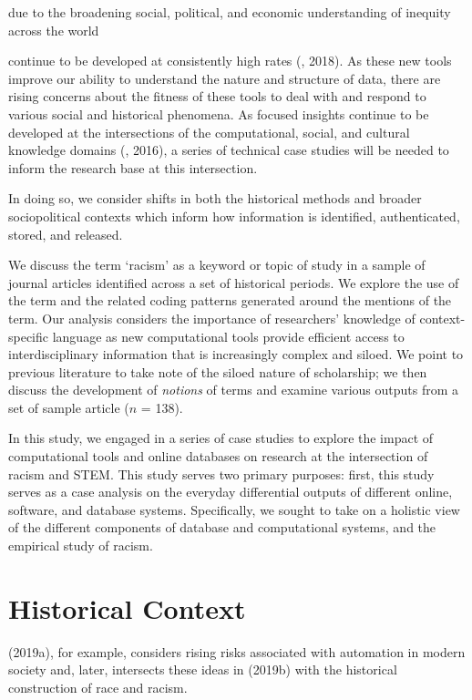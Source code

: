 due to the broadening social, political, and economic understanding of inequity across the world 

 continue to be developed at consistently high rates (\citeauthor{walker2018}, 2018). As these new tools improve our ability to understand the nature and structure of data, there are rising concerns about the fitness of these tools to deal with and respond to various social and historical phenomena. As focused insights continue to be developed at the intersections of the computational, social, and cultural knowledge domains (\cite{dixon2016algo}, 2016), a series of technical case studies will be needed to inform the research base at this intersection.

 In doing so, we consider shifts in both the historical methods and broader sociopolitical contexts which inform how information is identified, authenticated, stored, and released. 

We discuss the term `racism' as a keyword or topic of study in a sample of journal articles identified across a set of historical periods. We explore the use of the term and the related coding patterns generated around the mentions of the term. Our analysis considers the importance of researchers' knowledge of context-specific language as new computational tools provide efficient access to interdisciplinary information that is increasingly complex and siloed. We point to previous literature to take note of the siloed nature of scholarship; we then discuss the development of \textit{notions} of terms and examine various outputs from a set of sample article ($n$ = 138).

 

In this study, we engaged in a series of case studies to explore the impact of computational tools and online databases on research at the intersection of racism and STEM. This study serves two primary purposes: first, this study serves as a case analysis on the everyday differential outputs of different online, software, and database systems. Specifically, we sought to take on a holistic view of the different components of database and computational systems, and the empirical study of racism.

\section{Historical Context}
 
\cite{benjamin2019assessing} (2019a), for example, considers rising risks associated with automation in modern society and, later, intersects these ideas in \cite{benjamin2019race} (2019b) with the historical construction of race and racism.

